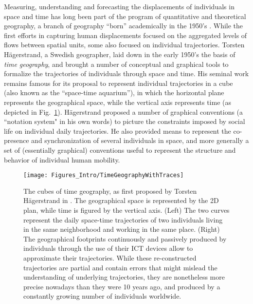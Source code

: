  Measuring, understanding and forecasting the displacements of individuals in space and time has long been part of the program of quantitative and theoretical geography, a branch of geography ``born'' academically in the 1950's \cite{berry_1993_geographys,adams_2001_quantitative}. While the first efforts in capturing human displacements focused on the aggregated levels of flows between spatial units, some also focused on individual trajectories. Torsten H\"agerstrand, a Swedish geographer, laid down in the early 1950's the basis of \emph{time geography}, and brought a number of conceptual and graphical tools to formalize the trajectories of individuals through space and time. His seminal work \cite{hagerstraand_1970_what} remains famous for its proposal to represent individual trajectories in a cube (also known as the ``space-time aquarium''), in which the horizontal plane represents the geographical space, while the vertical axis represents time (as depicted in Fig.~\ref{fig:timegeo-cube}). %
H\"agerstrand proposed a number of graphical conventions (a ``notation system" in his own words) to picture the constraints imposed by social life on individual daily trajectories. He also provided means to represent the co-presence and synchronization of several individuals in space, and more generally a set of (essentially graphical) conventions useful to represent the structure and behavior of individual human mobility. 
\begin{figure}[tpb]
  \centering
\texttt{[image: Figures\_Intro/TimeGeographyWithTraces]}
  \caption{The cubes of time geography, as first proposed by Torsten H\"agerstrand in \cite{hagerstraand_1970_what}. The geographical space is represented by the 2D plan, while time is figured by the vertical axis. (Left) The two curves represent the daily space-time trajectories of two individuals living in the same neighborhood and working in the same place. (Right) The geographical footprints continuously and passively produced by individuals through the use of their ICT devices allow to approximate their trajectories. While these re-constructed trajectories are partial and contain errors that might mislead the understanding of underlying trajectories, they are nonetheless more precise nowadays than they were 10 years ago, and produced by a constantly growing number of individuals worldwide.}
\label{fig:timegeo-cube}
\end{figure}

